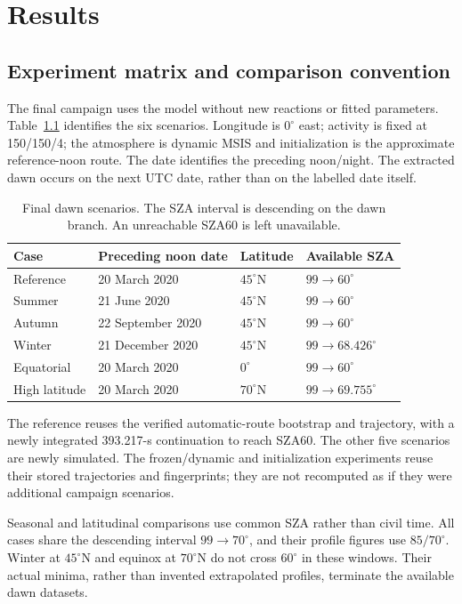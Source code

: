 \chapter{Results}\label{ch:results}
\section{Experiment matrix and comparison convention}
The final campaign uses the model without new reactions or fitted parameters. Table~\ref{tab:matrix} identifies the six scenarios. Longitude is $0^\circ$ east; activity is fixed at 150/150/4; the atmosphere is dynamic MSIS and initialization is the approximate reference-noon route. The date identifies the preceding noon/night. The extracted dawn occurs on the next UTC date, rather than on the labelled date itself.

\begin{table}[htbp]\centering\small
\caption{Final dawn scenarios. The SZA interval is descending on the dawn branch. An unreachable SZA60 is left unavailable.}\label{tab:matrix}
\begin{tabular}{llll}\toprule Case & Preceding noon date & Latitude & Available SZA\\\midrule
Reference & 20 March 2020 & $45^\circ$N & $99\to60^\circ$\\
Summer & 21 June 2020 & $45^\circ$N & $99\to60^\circ$\\
Autumn & 22 September 2020 & $45^\circ$N & $99\to60^\circ$\\
Winter & 21 December 2020 & $45^\circ$N & $99\to68.426^\circ$\\
Equatorial & 20 March 2020 & $0^\circ$ & $99\to60^\circ$\\
High latitude & 20 March 2020 & $70^\circ$N & $99\to69.755^\circ$\\\bottomrule
\end{tabular}\end{table}

The reference reuses the verified automatic-route bootstrap and trajectory, with a newly integrated 393.217-s continuation to reach SZA60. The other five scenarios are newly simulated. The frozen/dynamic and initialization experiments reuse their stored trajectories and fingerprints; they are not recomputed as if they were additional campaign scenarios.

Seasonal and latitudinal comparisons use common SZA rather than civil time. All cases share the descending interval $99\to70^\circ$, and their profile figures use $85/70^\circ$. Winter at $45^\circ$N and equinox at $70^\circ$N do not cross $60^\circ$ in these windows. Their actual minima, rather than invented extrapolated profiles, terminate the available dawn datasets.

